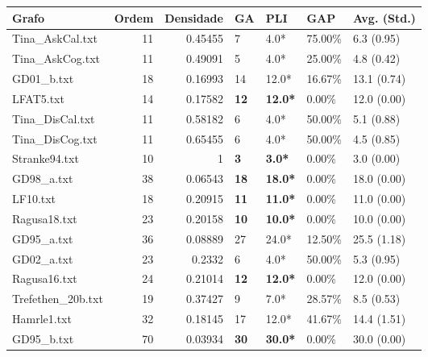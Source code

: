 \begin{table}[h]
    \centering
\begin{tabular}{lrrllll}
\hline
 Grafo              &   Ordem &   Densidade & GA           & PLI             & GAP      & Avg. (Std.)    \\
\hline
 Tina_AskCal.txt    &      11 &     0.45455 & 7            & 4.0*            & 75.00\%  & 6.3 (0.95)     \\
 Tina_AskCog.txt    &      11 &     0.49091 & 5            & 4.0*            & 25.00\%  & 4.8 (0.42)     \\
 GD01_b.txt         &      18 &     0.16993 & 14           & 12.0*           & 16.67\%  & 13.1 (0.74)    \\
 LFAT5.txt          &      14 &     0.17582 & \textbf{12}  & \textbf{12.0*}  & 0.00\%   & 12.0 (0.00)    \\
 Tina_DisCal.txt    &      11 &     0.58182 & 6            & 4.0*            & 50.00\%  & 5.1 (0.88)     \\
 Tina_DisCog.txt    &      11 &     0.65455 & 6            & 4.0*            & 50.00\%  & 4.5 (0.85)     \\
 Stranke94.txt      &      10 &     1       & \textbf{3}   & \textbf{3.0*}   & 0.00\%   & 3.0 (0.00)     \\
 GD98_a.txt         &      38 &     0.06543 & \textbf{18}  & \textbf{18.0*}  & 0.00\%   & 18.0 (0.00)    \\
 LF10.txt           &      18 &     0.20915 & \textbf{11}  & \textbf{11.0*}  & 0.00\%   & 11.0 (0.00)    \\
 Ragusa18.txt       &      23 &     0.20158 & \textbf{10}  & \textbf{10.0*}  & 0.00\%   & 10.0 (0.00)    \\
 GD95_a.txt         &      36 &     0.08889 & 27           & 24.0*           & 12.50\%  & 25.5 (1.18)    \\
 GD02_a.txt         &      23 &     0.2332  & 6            & 4.0*            & 50.00\%  & 5.3 (0.95)     \\
 Ragusa16.txt       &      24 &     0.21014 & \textbf{12}  & \textbf{12.0*}  & 0.00\%   & 12.0 (0.00)    \\
 Trefethen_20b.txt  &      19 &     0.37427 & 9            & 7.0*            & 28.57\%  & 8.5 (0.53)     \\
 Hamrle1.txt        &      32 &     0.18145 & 17           & 12.0*           & 41.67\%  & 14.4 (1.51)    \\
 GD95_b.txt         &      70 &     0.03934 & \textbf{30}  & \textbf{30.0*}  & 0.00\%   & 30.0 (0.00)    \\

\end{tabular}
\end{table}
